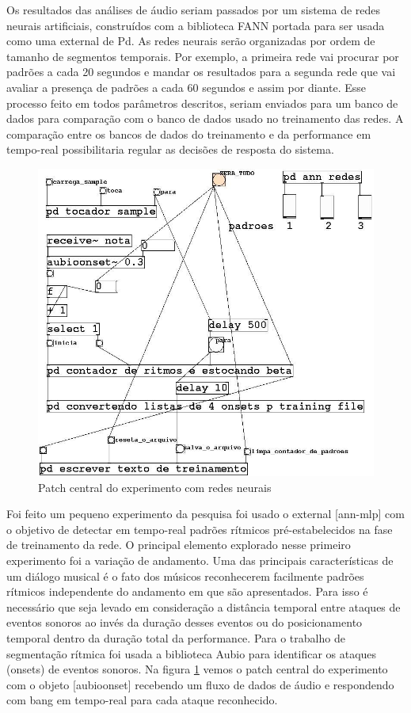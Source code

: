\documentclass{ppgmus}
\begin{document}
Os resultados das análises de áudio seriam passados por um sistema de redes neurais artificiais, 
construídos com a biblioteca FANN\cite{fann}  portada para ser usada como uma external de Pd. As redes neurais serão organizadas 
por ordem de tamanho de segmentos temporais. Por exemplo, a primeira rede vai procurar por padrões a cada 20 segundos e 
mandar os resultados para a segunda rede que vai avaliar a presença de padrões a cada 60 segundos e assim por diante. 
Esse processo feito em todos parâmetros descritos, seriam enviados para um banco de dados
 para comparação com o banco de dados usado no treinamento das redes. A comparação entre os bancos de dados do 
treinamento e da performance em tempo-real possibilitaria regular as decisões de resposta do sistema.

\begin{figure}
\includegraphics[scale=.5]{fann1}
\caption{Patch central do experimento com redes neurais}
\label{fann1}
\end{figure} 
 
Foi feito um pequeno experimento da pesquisa  foi usado o external [ann-mlp] com o objetivo de detectar  em tempo-real padrões 
rítmicos pré-estabelecidos na fase de treinamento da rede.
    O principal elemento explorado  nesse primeiro experimento foi a variação de andamento. Uma das principais 
características de um diálogo musical é o fato dos músicos reconhecerem facilmente padrões rítmicos independente do 
andamento em que são apresentados. Para isso é necessário que seja levado em consideração a distância temporal entre 
ataques de eventos sonoros ao invés da duração desses eventos ou do posicionamento temporal dentro da duração total da 
performance. Para o trabalho de segmentação rítmica foi usada a biblioteca Aubio para identificar os ataques (onsets) de eventos 
sonoros. Na figura \ref{fann1} vemos o patch central do experimento com o objeto  [aubioonset\texttildelow] recebendo um fluxo de 
dados de áudio e respondendo com bang em tempo-real para cada ataque reconhecido.
\end{document}
